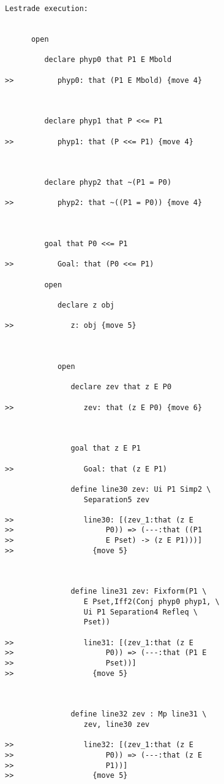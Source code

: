 \documentclass[12pt]{article}
\begin{document}
\begin{verbatim}Lestrade execution:


      open

         declare phyp0 that P1 E Mbold

>>          phyp0: that (P1 E Mbold) {move 4}



         declare phyp1 that P <<= P1

>>          phyp1: that (P <<= P1) {move 4}



         declare phyp2 that ~(P1 = P0)

>>          phyp2: that ~((P1 = P0)) {move 4}



         goal that P0 <<= P1

>>          Goal: that (P0 <<= P1)

         open

            declare z obj

>>             z: obj {move 5}



            open

               declare zev that z E P0

>>                zev: that (z E P0) {move 6}



               goal that z E P1

>>                Goal: that (z E P1)

               define line30 zev: Ui P1 Simp2 \
                  Separation5 zev

>>                line30: [(zev_1:that (z E
>>                     P0)) => (---:that ((P1
>>                     E Pset) -> (z E P1)))]
>>                  {move 5}



               define line31 zev: Fixform(P1 \
                  E Pset,Iff2(Conj phyp0 phyp1, \
                  Ui P1 Separation4 Refleq \
                  Pset))

>>                line31: [(zev_1:that (z E
>>                     P0)) => (---:that (P1 E
>>                     Pset))]
>>                  {move 5}



               define line32 zev : Mp line31 \
                  zev, line30 zev

>>                line32: [(zev_1:that (z E
>>                     P0)) => (---:that (z E
>>                     P1))]
>>                  {move 5}




\end{verbatim}
\end{document}
